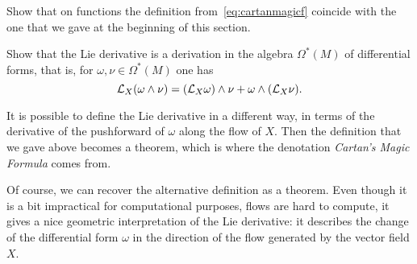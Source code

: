 \begin{exercise}
  Show that on functions the definition from~\eqref{eq:cartanmagicf} coincide with the one that  we gave at the beginning of this section.
\end{exercise}

\begin{exercise}\label{exe:liederandwedge}
Show that the Lie derivative is a derivation in the algebra $\Omega^*(M)$ of differential forms, that is, for $\omega,\nu\in\Omega^*(M)$ one has
\begin{equation}
  \mathcal{L}_X(\omega\wedge\nu) = (\mathcal{L}_X\omega)\wedge\nu + \omega\wedge(\mathcal{L}_X \nu).
\end{equation}
\end{exercise}

It is possible to define the Lie derivative in a different way, in terms of the derivative of the pushforward of $\omega$ along the flow of $X$.
Then the definition that we gave above becomes a theorem, which is where the denotation \emph{Cartan's Magic Formula} comes from.

Of course, we can recover the alternative definition as a theorem.
Even though it is a bit impractical for computational purposes, flows are hard to compute, it gives a nice geometric interpretation of the Lie derivative: it describes the change of the differential form $\omega$ in the direction of the flow generated by the vector field $X$.

